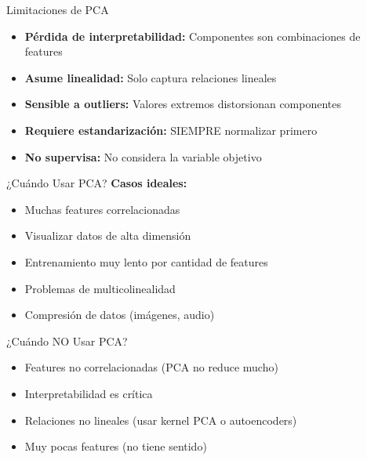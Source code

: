 \documentclass{beamer}
\begin{document}
\begin{frame}{Limitaciones de PCA}
    \begin{itemize}
        \item \textbf{Pérdida de interpretabilidad:} Componentes son combinaciones de features
        \item \textbf{Asume linealidad:} Solo captura relaciones lineales
        \item \textbf{Sensible a outliers:} Valores extremos distorsionan componentes
        \item \textbf{Requiere estandarización:} SIEMPRE normalizar primero
        \item \textbf{No supervisa:} No considera la variable objetivo
    \end{itemize}
\end{frame}

\begin{frame}{¿Cuándo Usar PCA?}
    \textbf{Casos ideales:}
    \begin{itemize}
        \item Muchas features correlacionadas
        \item Visualizar datos de alta dimensión
        \item Entrenamiento muy lento por cantidad de features
        \item Problemas de multicolinealidad
        \item Compresión de datos (imágenes, audio)
    \end{itemize}
\end{frame}

\begin{frame}{¿Cuándo NO Usar PCA?}
    \begin{itemize}
        \item Features no correlacionadas (PCA no reduce mucho)
        \item Interpretabilidad es crítica
        \item Relaciones no lineales (usar kernel PCA o autoencoders)
        \item Muy pocas features (no tiene sentido)
    \end{itemize}
\end{frame}
\end{document}
